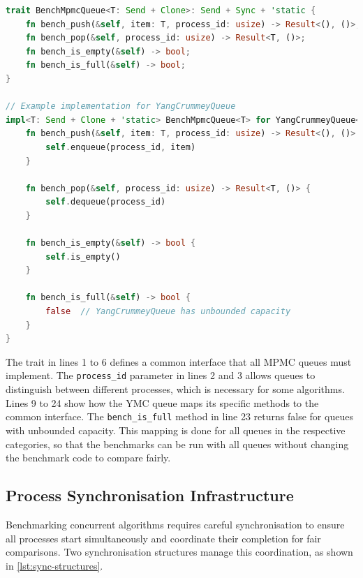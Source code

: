 \begin{lstlisting}[language=Rust, style=boxed, caption={Benchmark trait for MPMC queues}, label={lst:bench-trait}]
trait BenchMpmcQueue<T: Send + Clone>: Send + Sync + 'static {
    fn bench_push(&self, item: T, process_id: usize) -> Result<(), ()>;
    fn bench_pop(&self, process_id: usize) -> Result<T, ()>;
    fn bench_is_empty(&self) -> bool;
    fn bench_is_full(&self) -> bool;
}

// Example implementation for YangCrummeyQueue
impl<T: Send + Clone + 'static> BenchMpmcQueue<T> for YangCrummeyQueue<T> {
    fn bench_push(&self, item: T, process_id: usize) -> Result<(), ()> {
        self.enqueue(process_id, item)
    }

    fn bench_pop(&self, process_id: usize) -> Result<T, ()> {
        self.dequeue(process_id)
    }

    fn bench_is_empty(&self) -> bool {
        self.is_empty()
    }

    fn bench_is_full(&self) -> bool {
        false  // YangCrummeyQueue has unbounded capacity
    }
}
\end{lstlisting}

The trait in lines 1 to 6 defines a common interface that all \ac{MPMC} queues must implement. The \texttt{process\_id} parameter in lines 2 and 3 allows queues to distinguish between different processes, which is necessary for some algorithms. Lines 9 to 24 show how the \ac{YMC} queue maps its specific methods to the common interface. The \texttt{bench\_is\_full} method in line 23 returns false for queues with unbounded capacity. This mapping is done for all queues in the respective categories, so that the benchmarks can be run with all queues without changing the benchmark code to compare fairly.

\subsection{Process Synchronisation Infrastructure}
Benchmarking concurrent algorithms requires careful synchronisation to ensure all processes start simultaneously and coordinate their completion for fair comparisons. Two synchronisation structures manage this coordination, as shown in \cref{lst:sync-structures}.

